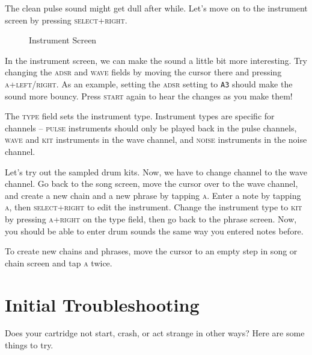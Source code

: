 The clean pulse sound might get dull after while. Let's move on to the instrument
screen by pressing \textsc{select+right}.

\begin{figure}[hbtp]
\centering
{}
\caption{Instrument Screen}
\label{fig:instr}
\end{figure}

In the instrument screen, we can make the sound a little bit more interesting.
Try changing the \textsc{adsr} and \textsc{wave} fields by moving the cursor there and pressing \textsc{a+left/right}.
As an example, setting the \textsc{adsr} setting to \texttt{A3} should make the sound more bouncy.
Press \textsc{start} again to hear the changes as you make them!

The \textsc{type} field sets the instrument type. Instrument types are specific for
channels -- \textsc{pulse} instruments should only be played back in the pulse channels, \textsc{wave} and \textsc{kit}
instruments in the wave channel, and \textsc{noise} instruments in the noise channel.

Let's try out the sampled drum kits. Now, we have to change channel to the wave channel.
Go back to the song screen, move the cursor over to the wave channel, and create a new
chain and a new phrase by tapping \textsc{a}.
Enter a note by tapping \textsc{a}, then \textsc{select+right} to edit the instrument.
Change the instrument type to \textsc{kit} by pressing \textsc{a+right} on the type field,
then go back to the phrase screen. Now, you should be able to enter drum sounds the same way
you entered notes before.

To create new chains and phrases, move the cursor to an empty step in song or chain screen and tap \textsc{a} twice.

\section{Initial Troubleshooting}

Does your cartridge not start, crash, or act strange in other ways? Here are some things to try.

